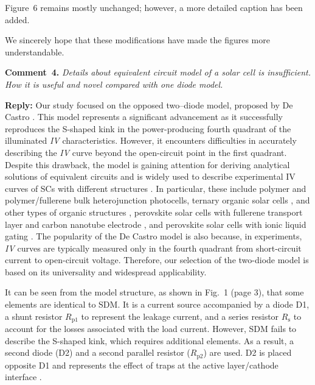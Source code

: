 \documentclass[a4paper,fleqn]{cas-sc}
\begin{document}
Figure~6 remains mostly unchanged; however, a more detailed caption has been added.


We sincerely hope that these modifications have made the figures more understandable.

\vspace{1cm}
\noindent
\textcolor[rgb]{0.00,0.50,1.00}{\textbf{Comment~4.}}
\emph{Details about equivalent circuit model of a solar cell is insufficient.
How it is useful and novel compared with one diode model.}



\noindent
\textcolor[rgb]{0.51,0.00,0.00}{\textbf{Reply:}}
Our study focused on the opposed two--diode model, proposed by De Castro \cite{Castro2010}.
This model represents a significant advancement
as it successfully reproduces the S-shaped kink in the power-producing fourth quadrant
of the illuminated \emph{IV} characteristics.
However, it encounters difficulties in accurately describing the \emph{IV} curve beyond the open-circuit point in the first quadrant.
Despite this drawback, the model is gaining attention for deriving analytical solutions
of equivalent circuits \cite{Yu2019a}
and is widely used to describe experimental IV curves of SCs with different structures
\cite{CastroUseBook,Pillai2017,Arredondo2018,delPozo2012,BrenesBadilla2018,Tada2015Organic,Makha2018,CastroUsePerovskitIonikLiquid,CastroUsePerovskitFullerene}.
In particular, these include polymer \cite{Tada2015Organic}
and polymer/fullerene \cite{delPozo2012} bulk heterojunction photocells,
ternary organic solar cells \cite{Makha2018},
and other types of organic structures \cite{Pillai2017,Arredondo2018},
perovskite solar cells with fullerene transport layer and carbon nanotube electrode \cite{CastroUsePerovskitFullerene},
and perovskite solar cells with ionic liquid gating \cite{CastroUsePerovskitIonikLiquid}.
The popularity of the De Castro model is also because, in experiments,
\emph{IV} curves are typically measured only in the fourth quadrant from short-circuit current to open-circuit voltage.
Therefore, our selection of the two-diode model is based on its universality and widespread applicability.

It can be seen from the model structure, as shown in Fig.~1 (page 3), that some elements are identical to SDM.
It is a current source accompanied by a diode D1, a shunt resistor $R_\mathrm{p1}$ to represent the leakage current,
and a series resistor $R_\mathrm{s}$ to account for the losses associated with the load current.
However, SDM fails to describe the S-shaped kink, which requires additional elements.
As a result, a second diode  (D2) and a second parallel resistor ($R_\mathrm{p2}$) are used.
D2 is placed opposite D1 and represents the effect of traps at the active layer/cathode interface \cite{Castro2010}.
\end{document}
